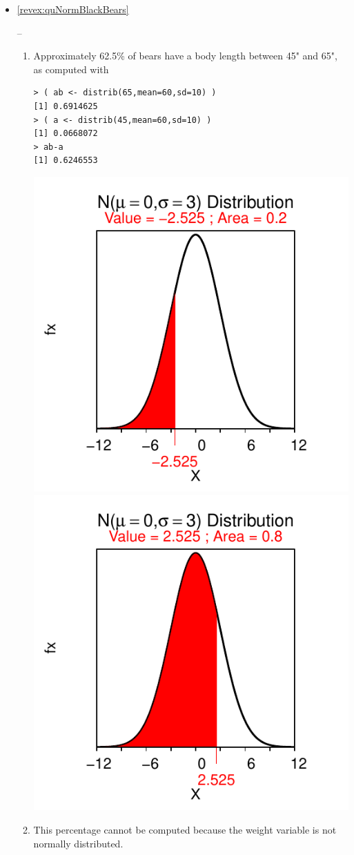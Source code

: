 \documentclass[10pt,openany]{book}\usepackage[]{graphicx}\usepackage[]{color}
\makeatletter
\newenvironment{kframe}{%
 \def\at@end@of@kframe{}%
 \ifinner\ifhmode%
  \def\at@end@of@kframe{\end{minipage}}%
  \begin{minipage}{\columnwidth}%
 \fi\fi%
 \def\FrameCommand##1{\hskip\@totalleftmargin \hskip-\fboxsep
 \colorbox{shadecolor}{##1}\hskip-\fboxsep
     \hskip-\linewidth \hskip-\@totalleftmargin \hskip\columnwidth}%
 \MakeFramed {\advance\hsize-\width
   \@totalleftmargin\z@ \linewidth\hsize
   \@setminipage}}%
 {\par\unskip\endMakeFramed%
 \at@end@of@kframe}
\newenvironment{knitrout}{}{} %
\makeatother
\begin{document}
\begin{itemize}
\begin{enumerate}
\begin{knitrout}
{}



\end{knitrout}
    \end{enumerate}

  \item \hypertarget{ans:quNormBlackBears}{\ref{revex:quNormBlackBears}} --
    \begin{enumerate}
      \item Approximately 62.5\% of bears have a body length between 45" and 65", as computed with
\begin{knitrout}
\color{fgcolor}\begin{kframe}
\begin{verbatim}
> ( ab <- distrib(65,mean=60,sd=10) )
[1] 0.6914625
> ( a <- distrib(45,mean=60,sd=10) )
[1] 0.0668072
> ab-a
[1] 0.6246553
\end{verbatim}
\end{kframe}

{\centering \includegraphics[width=.4\linewidth]{Figs/unnamed-chunk-236-1} 
\includegraphics[width=.4\linewidth]{Figs/unnamed-chunk-236-2} 

}



\end{knitrout}
      \item This percentage cannot be computed because the weight variable is not normally distributed.
    \end{enumerate}


\end{itemize}
\end{document}
